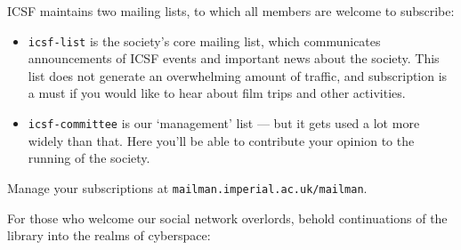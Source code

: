 

ICSF maintains two mailing lists, to which all members are welcome to
subscribe:

\begin{itemize}
\item \texttt{icsf-list}
is the society’s core mailing list, which communicates announcements
of ICSF events and important news about the society. This list does
not generate an overwhelming amount of traffic, and subscription is a
must if you would like to hear about film trips and other activities.

\item \texttt{icsf-committee}
is our ‘management’ list --- but it gets used a lot more
widely than that. Here you’ll be able to contribute your opinion to
the running of the society.
\end{itemize}

Manage your subscriptions at \texttt{mailman.imperial.ac.uk/mailman}.

For those who welcome our social network overlords, behold
continuations of the library into the realms of cyberspace:





